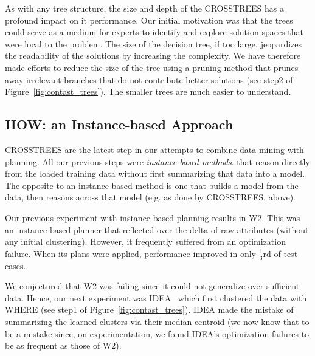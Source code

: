 \documentclass[conference]{IEEEtran}
\newcommand{\fig}[1]{Figure~\ref{fig:#1}}
\begin{document}
 
 
	

As with any tree structure, the size and depth of the CROSSTREES has a profound impact on it performance. Our initial motivation was that the trees could serve as a medium for experts to identify and explore solution spaces that were local to the problem. The size of the decision tree, if too large, jeopardizes the readability of the solutions by increasing the complexity. We have therefore made efforts to reduce the size of the tree using  a pruning method that prunes away irrelevant branches that do not contribute better solutions (see step2 of \fig{contast_trees}). The smaller trees are much easier to understand.



	\subsection{HOW: an Instance-based Approach}
	CROSSTREES are the latest step in our attempts to combine data mining
	with planning.   All our previous steps were {\em instance-based methods}. 
that   reason directly
	from the loaded training data without first summarizing that data into a model.
	The opposite to an instance-based method is one that builds
	a model from the data, then reasons across that model (e.g. as done by
	CROSSTREES, above). 
	
	Our previous experiment with instance-based planning
	results in  W2. This was an instance-based planner that reflected over the delta of raw attributes \cite{6600685} (without any initial clustering). However, it frequently suffered from an optimization failure. When its plans were applied, performance improved in only $\tfrac{1}{3}$rd of test cases. 

	We conjectured that W2 was failing since it could not generalize over sufficient
	data. Hence, our next experiment was IDEA~\cite{me12c} which first clustered the data with WHERE (see step1 of  \fig{contast_trees}). IDEA made the mistake of summarizing the learned clusters via their median centroid (we now know that to be a mistake since, on experimentation, we found
	IDEA's optimization failures to be as frequent as those of W2).
 
\end{document}

